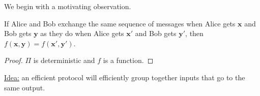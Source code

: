 We begin with a motivating observation.
\pause
\begin{lemma}
If Alice and Bob exchange the same sequence of messages when Alice gets $\textbf{x}$ and Bob gets $\textbf{y}$ as they do when Alice gets $\textbf{x}'$ and Bob gets $\textbf{y}'$, then $f(\textbf{x}, \textbf{y}) = f(\textbf{x}', \textbf{y}')$.
\end{lemma}
\pause
\begin{proof}
$\Pi$ is deterministic and $f$ is a function.
\end{proof}
\pause
\underline{Idea:} an efficient protocol will efficiently group together inputs that go to the same output.
